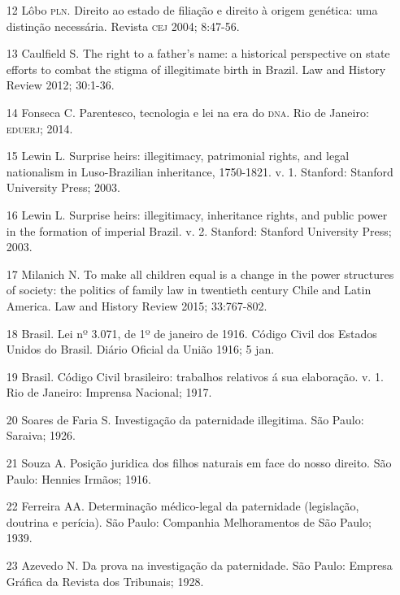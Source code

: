 \documentclass{article}
\begin{document}
\begin{itemize}
\item[12] Lôbo \textsc{pln}. Direito ao estado de filiação e direito à origem
genética: uma distinção necessária. Revista \textsc{cej} 2004; 8:47-56.

\item[13] Caulfield S. The right to a father's name: a historical
perspective on state efforts to combat the stigma of illegitimate birth in
Brazil. Law and History Review 2012; 30:1-36.

\item[14] Fonseca C. Parentesco, tecnologia e lei na era do \textsc{dna}. Rio de
Janeiro: \textsc{eduerj}; 2014.

\item[15] Lewin L. Surprise heirs: illegitimacy, patrimonial rights, and
legal nationalism in Luso-Brazilian inheritance, 1750-1821. v. 1. Stanford:
Stanford University Press; 2003.

\item[16] Lewin L. Surprise heirs: illegitimacy, inheritance rights, and
public power in the formation of imperial Brazil. v. 2. Stanford: Stanford
University Press; 2003.

\item[17] Milanich N. To make all children equal is a change in the power
structures of society: the politics of family law in twentieth century Chile and
Latin America. Law and History Review 2015; 33:767-802.

\item[18] Brasil. Lei nº 3.071, de 1º de janeiro de 1916. Código Civil dos
Estados Unidos do Brasil. Diário Oficial da União 1916; 5 jan.

\item[19] Brasil. Código Civil brasileiro: trabalhos relativos á sua
elaboração. v. 1. Rio de Janeiro: Imprensa Nacional; 1917.

\item[20] Soares de Faria S. Investigação da paternidade illegitima. São
Paulo: Saraiva; 1926.

\item[21] Souza A. Posição juridica dos filhos naturais em face do nosso
direito. São Paulo: Hennies Irmãos; 1916.

\item[22] Ferreira AA. Determinação médico-legal da paternidade (legislação,
doutrina e perícia). São Paulo: Companhia Melhoramentos de São Paulo; 1939.

\item[23] Azevedo N. Da prova na investigação da paternidade. São Paulo:
Empresa Gráfica da Revista dos Tribunais; 1928.


\end{itemize}
\end{document}
